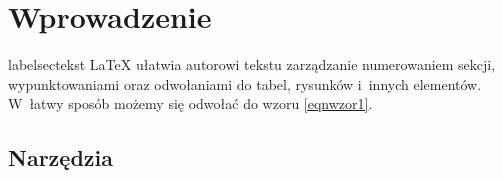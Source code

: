 \section{Wprowadzenie}label{sectekst}
LaTeX ułatwia autorowi tekstu zarządzanie 
numerowaniem sekcji, wypunktowaniami oraz odwołaniami 
do tabel, rysunków i~innych elementów. W~łatwy sposób 
możemy się odwołać do wzoru \ref{eqnwzor1}.

\subsection{Narzędzia}



